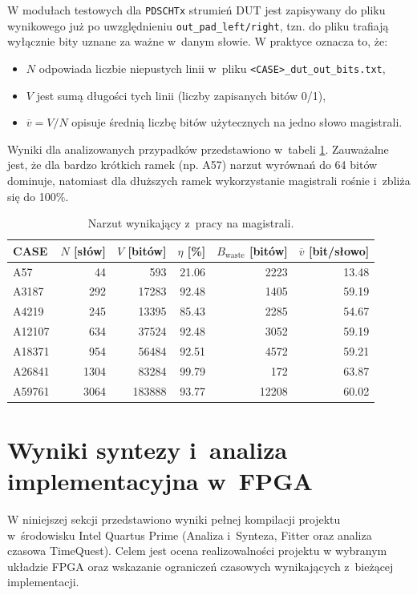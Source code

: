 W modułach testowych dla \texttt{PDSCHTx} strumień DUT jest zapisywany do pliku wynikowego już po uwzględnieniu
\texttt{out\_pad\_left/right}, tzn. do pliku trafiają wyłącznie bity uznane za ważne w~danym słowie.
W praktyce oznacza to, że:
\begin{itemize}
    \item $N$ odpowiada liczbie niepustych linii w~pliku \texttt{<CASE>\_dut\_out\_bits.txt},
    \item $V$ jest sumą długości tych linii (liczby zapisanych bitów 0/1),
    \item $\overline{v}=V/N$ opisuje średnią liczbę bitów użytecznych na jedno słowo magistrali.
\end{itemize}

Wyniki dla analizowanych przypadków przedstawiono w~tabeli \ref{tab:pdsch_bus_overhead}. Zauważalne jest,
że dla bardzo krótkich ramek (np. A57) narzut wyrównań do 64 bitów dominuje, natomiast dla dłuższych ramek
wykorzystanie magistrali rośnie i~zbliża się do 100\%.

\begin{table}[!ht]
\centering
\caption{Narzut wynikający z~pracy na magistrali.}
\label{tab:pdsch_bus_overhead}
\begin{tabular}{lrrrrr}
\hline
CASE & $N$ [słów] & $V$ [bitów] & $\eta$ [\%] & $B_{\mathrm{waste}}$ [bitów] & $\overline{v}$ [bit/słowo] \\
\hline
A57     & 44   & 593    & 21.06 & 2223  & 13.48 \\
A3187   & 292  & 17283  & 92.48 & 1405  & 59.19 \\
A4219   & 245  & 13395  & 85.43 & 2285  & 54.67 \\
A12107  & 634  & 37524  & 92.48 & 3052  & 59.19 \\
A18371  & 954  & 56484  & 92.51 & 4572  & 59.21 \\
A26841  & 1304 & 83284  & 99.79 & 172   & 63.87 \\
A59761  & 3064 & 183888 & 93.77 & 12208 & 60.02 \\
\hline
\end{tabular}
\end{table}

\section{Wyniki syntezy i~analiza implementacyjna w~FPGA}
\label{sec:synteza_i_analiza_impl}

W niniejszej sekcji przedstawiono wyniki pełnej kompilacji projektu w~środowisku Intel Quartus Prime
(Analiza i~Synteza, Fitter oraz analiza czasowa TimeQuest). Celem jest ocena realizowalności projektu
w wybranym układzie FPGA oraz wskazanie ograniczeń czasowych wynikających z~bieżącej implementacji.

